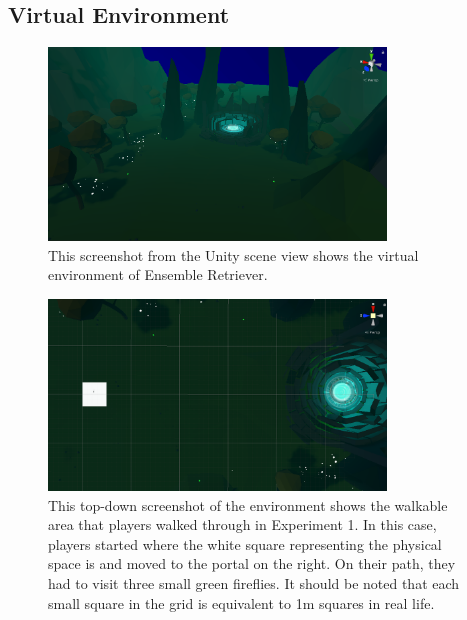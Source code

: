 \subsection{Virtual Environment}
\begin{figure}[tbph]
    \centering
    \includegraphics[width=0.8\textwidth]{figures/screenshots/EnvironmentKindaLowRes.png}
    \caption[Screenshot of the Environment in Ensemble Retriever]{This screenshot from the Unity scene view shows the virtual environment of Ensemble Retriever.}
    \label{fig:ensembleRetrieverEnvironment}
\end{figure}

\begin{figure}[tbph]
    \centering
    \includegraphics[width=0.8\textwidth]{figures/screenshots/TopDownExperiment1Spawn.png}
    \caption[Top Down Screenshot of Virtual Space That Players Walked Through]{This top-down screenshot of the environment shows the walkable area that players walked through in Experiment 1. In this case, players started where the white square representing the physical space is and moved to the portal on the right. On their path, they had to visit three small green fireflies. It should be noted that each small square in the grid is equivalent to 1m squares in real life.}
    \label{fig:topDownViewOfEnvironment}
\end{figure}

